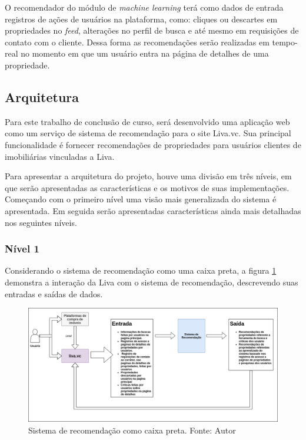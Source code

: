 O recomendador do módulo de \textit{machine learning} terá como dados de entrada registros de ações de usuários na plataforma, como: cliques ou descartes em propriedades no \textit{feed}, alterações no perfil de busca e até mesmo em requisições de contato com o cliente. Dessa forma as recomendações serão realizadas em tempo-real no momento em que um usuário entra na página de detalhes de uma propriedade.

\subsection{Arquitetura}

Para este trabalho de conclusão de curso, será desenvolvido uma aplicação web como um serviço de sistema de recomendação para o site Liva.vc. Sua principal funcionalidade é fornecer recomendações de propriedades para usuários clientes de imobiliárias vinculadas a Liva.

Para apresentar a arquitetura do projeto, houve uma divisão em três níveis, em que serão apresentadas as características e os motivos de suas implementações. Começando com o primeiro nível uma visão mais generalizada do sistema é apresentada. Em seguida serão apresentadas características ainda mais detalhadas nos seguintes níveis. 

\subsubsection{Nível 1}

Considerando o sistema de recomendação como uma caixa preta, a figura \ref{fig:sr_nivel1} demonstra a interação da Liva com o sistema de recomendação, descrevendo suas entradas e saídas de dados.

\begin{figure}[H]
    \centering
    \includegraphics[scale=0.4]{figuras/proposta/sr_nivel1.png}
    \caption[Sistema de recomendação como caixa preta]{Sistema de recomendação como caixa preta. Fonte: Autor}
    \label{fig:sr_nivel1}
\end{figure}

